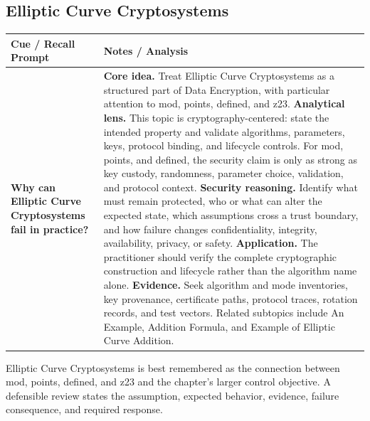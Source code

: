 \documentclass[11pt]{article}
\newcommand{\CornellHeader}{%
\rowcolor{Navy}\color{white}\bfseries Cue / Recall Prompt & \color{white}\bfseries Notes / Analysis\\\hline}
\newcommand{\CornellRow}[2]{%
\cellcolor{CueGray}\RaggedRight\textbf{#1} & \RaggedRight #2\\\hline}
\begin{document}
\subsection*{Elliptic Curve Cryptosystems}
\begin{longtable}{>{\RaggedRight\arraybackslash}p{}|>{\RaggedRight\arraybackslash}p{}}
\CornellHeader
\CornellRow{Why can Elliptic Curve Cryptosystems fail in practice?}{\textbf{Core idea.} Treat Elliptic Curve Cryptosystems as a structured part of Data Encryption, with particular attention to mod, points, defined, and z23. \textbf{Analytical lens.} This topic is cryptography-centered: state the intended property and validate algorithms, parameters, keys, protocol binding, and lifecycle controls. For mod, points, and defined, the security claim is only as strong as key custody, randomness, parameter choice, validation, and protocol context. \textbf{Security reasoning.} Identify what must remain protected, who or what can alter the expected state, which assumptions cross a trust boundary, and how failure changes confidentiality, integrity, availability, privacy, or safety. \textbf{Application.} The practitioner should verify the complete cryptographic construction and lifecycle rather than the algorithm name alone. \textbf{Evidence.} Seek algorithm and mode inventories, key provenance, certificate paths, protocol traces, rotation records, and test vectors. Related subtopics include An Example, Addition Formula, and Example of Elliptic Curve Addition.}
\end{longtable}
\begin{topicsummary}
Elliptic Curve Cryptosystems is best remembered as the connection between mod, points, defined, and z23 and the chapter's larger control objective. A defensible review states the assumption, expected behavior, evidence, failure consequence, and required response.
\end{topicsummary}
\end{document}
